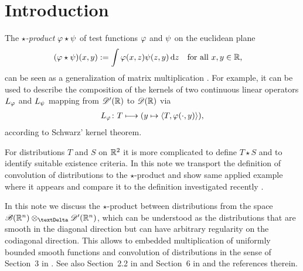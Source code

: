 \section{Introduction}
\label{int}

The {\em $\star$-product} $ \varphi \star \psi $
of test functions $ \varphi $ and $ \psi $ on the euclidean plane
\begin{align}
    ( \varphi \star \psi )(x,y)
    &:=
    \int \varphi(x,z)\psi(z,y) \,\mathrm{ d }{ z }
    &&\text{for all $ x,y \in \mathbb{ R } $,}
\end{align}
can be seen as a generalization of matrix multiplication \cite{RBG025}.
For example, it can be used to describe the composition of the kernels
of two continuous linear operators $ L_\varphi $ and $ L_\psi $
mapping from $ \mathscr{  D  }'( \mathbb{ R } ) $ to $ \mathscr{  D  }( \mathbb{ R } ) $ via
\begin{align}
    L_\varphi \colon T \longmapsto ( y \mapsto \langle T , \varphi(\cdot,y) \rangle ),
\end{align}
according to Schwarz' kernel theorem.

For distributions $ T $ and $ S $ on $ \mathbb{ R }^2 $
it is more complicated to define $ T \star S $
and to identify suitable existence criteria.
In this note we transport the definition
of convolution of distributions to the $\star$-product
and show same applied example where it appears
and compare it to the definition investigated recently \cite{RBG025}.

In this note we discuss the $ \star $-product between distributions
from the space $ \fsSmobnd(\nrR^n) \teproDi \fsDis(\nrR^n) $,
which can be understood as the distributions
that are smooth in the diagonal direction but can have
arbitrary regularity on the codiagonal direction.
This allows to embedded multiplication of uniformly bounded smooth functions
and convolution of distributions in the sense of Section~3 in \cite[p.\,370]{ort004}.
See also Section~2.2 in \cite[p.\,129]{KH022a}
and Section~6 in \cite[p.\,1959]{KH023} and the references therein.